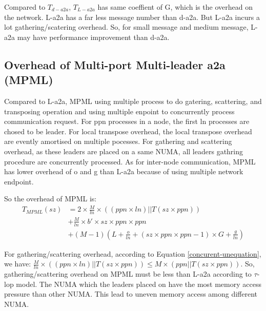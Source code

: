 Compared to $T_{d-a2a}$, $T_{L-a2a}$ has same coeffient of G, which is the overhead on the network.
L-a2a has a far less message number than d-a2a.
But L-a2a incurs a lot gathering/scatering overhead.
So, for small message and medium message, L-a2a may have performance improvement than d-a2a.

\subsection {Overhead of  Multi-port Multi-leader a2a (MPML)}

Compared to L-a2a, MPML using multiple process to do gatering, scattering, and transposing operation and using multiple enpoint to concurrently process communication request.
For ppn processes in a node, the first ln processes are chosed to be leader.
For local transpose overhead, the local transpose overhead are evently amortised on multiple pocesses.
For gathering and scattering overhead, as these leaders are placed on a same NUMA, all leaders gathring procedure are concurrently processed.
As for inter-node communication, MPML has lower overhead  of o and g than L-a2a because of using multiple network endpoint.

So the overhead of MPML is:
\begin{equation}
\begin{split}
T_{MPML}(sz) & = 2 \times \frac{M}{ln} \times ((ppn\times ln)||T(sz\times ppn)) \\
			  & + \frac{M}{ln} \times b'\times sz\times ppn\times ppn \\
			  & + (M-1)  (L + \frac{o}{ln} +(sz\times ppn\times ppn - 1) \times G + \frac{g}{ln})
\end{split}
\label{MPML-overhead}
\end{equation}

For gathering/scattering overhead, according to Equation \ref{concurent-unequation}, we have:
$\frac{M}{ln} \times ((ppn\times ln)||T(sz\times ppn)) \le M\times (ppn||T(sz\times ppn))$.
So, gathering/scattering overhead on MPML must be less than L-a2a according to $\tau$-lop model.
The NUMA which the leaders placed on have the most memory access pressure than other NUMA.
This lead to uneven memory access among different NUMA.

